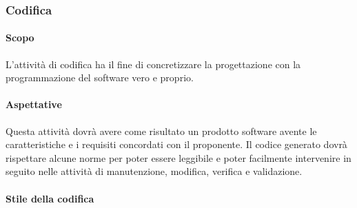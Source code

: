 \subsubsection{Codifica}
\paragraph{Scopo}
L'attività di codifica ha il fine di concretizzare la progettazione con la programmazione del software vero e proprio.
\paragraph{Aspettative}
Questa attività dovrà avere come risultato un prodotto software avente le caratteristiche e i requisiti concordati con il proponente. Il codice generato dovrà rispettare alcune norme per poter essere leggibile e poter facilmente intervenire in seguito nelle attività di manutenzione, modifica, verifica e validazione.
\paragraph{Stile della codifica}
